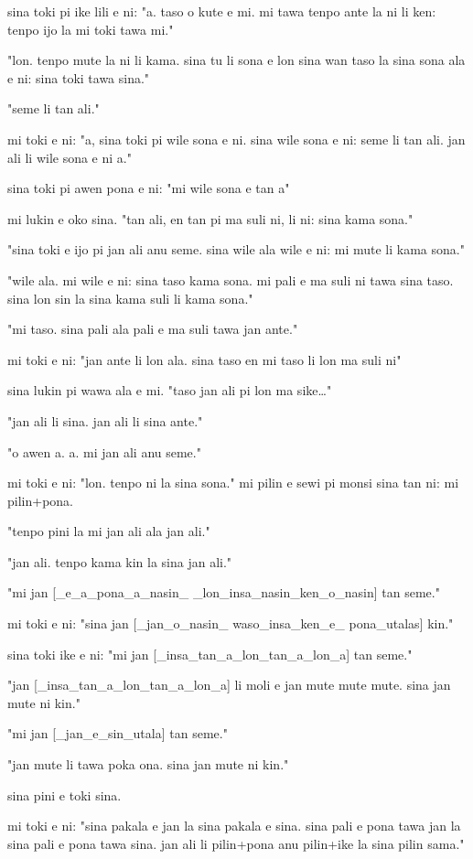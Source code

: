 \documentclass{article}
\begin{document}
sina toki pi ike lili e ni: "a. taso o kute e mi. mi tawa tenpo ante la ni li ken: tenpo ijo la mi toki tawa mi."

"lon. tenpo mute la ni li kama. sina tu li sona e lon sina wan taso la sina sona ala e ni: sina toki tawa sina."

"seme li tan ali."

mi toki e ni: "a, sina toki pi wile sona e ni. sina wile sona e ni: seme li tan ali. jan ali li wile sona e ni a."

sina toki pi awen pona e ni: "mi wile sona e tan a"

mi lukin e oko sina. "tan ali, en tan pi ma suli ni, li ni: sina kama sona."

"sina toki e ijo pi jan ali anu seme. sina wile ala wile e ni: mi mute li kama sona."

"wile ala. mi wile e ni: sina taso kama sona. mi pali e ma suli ni tawa sina taso. sina lon sin la sina kama suli li kama sona."

"mi taso. sina pali ala pali e ma suli tawa jan ante."

mi toki e ni: "jan ante li lon ala. sina taso en mi taso li lon ma suli ni"

sina lukin pi wawa ala e mi. "taso jan ali pi lon ma sike…"

"jan ali li sina. jan ali li sina ante."

"o awen a. a. mi jan ali anu seme."

mi toki e ni: "lon. tenpo ni la sina sona." mi pilin e sewi pi monsi sina tan ni: mi pilin+pona.

"tenpo pini la mi jan ali ala jan ali."

"jan ali. tenpo kama kin la sina jan ali."

"mi jan {[}\_e\_a\_pona\_a\_nasin\_  \_lon\_insa\_nasin\_ken\_o\_nasin{]} tan seme."

mi toki e ni: "sina jan {[}\_jan\_o\_nasin\_ waso\_insa\_ken\_e\_ pona\_utalas{]} kin."

sina toki ike e ni: "mi jan {[}\_insa\_tan\_a\_lon\_tan\_a\_lon\_a{]} tan seme."

"jan {[}\_insa\_tan\_a\_lon\_tan\_a\_lon\_a{]} li moli e jan mute mute mute. sina jan mute ni kin."

"mi jan {[}\_jan\_e\_sin\_utala{]} tan seme."

"jan mute li tawa poka ona. sina jan mute ni kin."

sina pini e toki sina.

mi toki e ni: "sina pakala e jan la sina pakala e sina. sina pali e pona tawa jan la sina pali e pona tawa sina. jan ali li pilin+pona anu pilin+ike la sina pilin sama."
\end{document}
